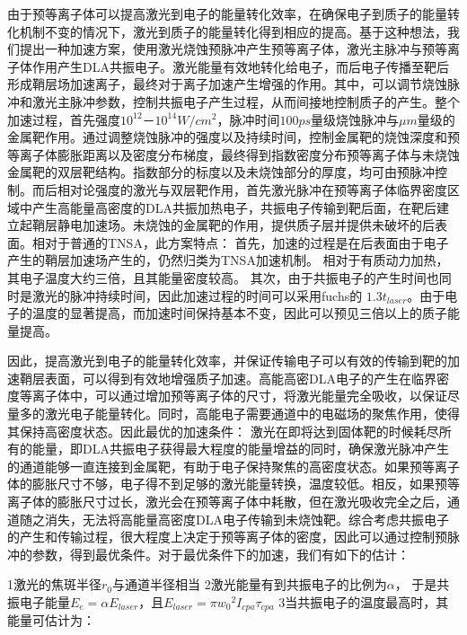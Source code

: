 由于预等离子体可以提高激光到电子的能量转化效率，在确保电子到质子的能量转化机制不变的情况下，激光到质子的能量转化得到相应的提高。基于这种想法，我们提出一种加速方案，使用激光烧蚀预脉冲产生预等离子体，激光主脉冲与预等离子体作用产生DLA共振电子。激光能量有效地转化给电子，而后电子传播至靶后形成鞘层场加速离子，最终对于离子加速产生增强的作用。其中，可以调节烧蚀脉冲和激光主脉冲参数，控制共振电子产生过程，从而间接地控制质子的产生。整个加速过程，首先强度$10^{12}－10^{14} W/cm^2$，脉冲时间$100ps$量级烧蚀脉冲与$\mu m$量级的金属靶作用。通过调整烧蚀脉冲的强度以及持续时间，控制金属靶的烧蚀深度和预等离子体膨胀距离以及密度分布梯度，最终得到指数密度分布预等离子体与未烧蚀金属靶的双层靶结构。指数部分的标度以及未烧蚀部分的厚度，均可由预脉冲控制。而后相对论强度的激光与双层靶作用，首先激光脉冲在预等离子体临界密度区域中产生高能量高密度的DLA共振加热电子，共振电子传输到靶后面，在靶后建立起鞘层静电加速场。未烧蚀的金属靶的作用，提供质子层并提供未破坏的后表面。相对于普通的TNSA，此方案特点：
首先，加速的过程是在后表面由于电子产生的鞘层加速场产生的，仍然归类为TNSA加速机制。
相对于有质动力加热，其电子温度大约三倍，且其能量密度较高。
其次，由于共振电子的产生时间也同时是激光的脉冲持续时间，因此加速过程的时间可以采用fuchs的 $1.3 t_{laser}$\cite{fuchs2006laser}。由于电子的温度的显著提高，而加速时间保持基本不变，因此可以预见三倍以上的质子能量提高。





因此，提高激光到电子的能量转化效率，并保证传输电子可以有效的传输到靶的加速鞘层表面，可以得到有效地增强质子加速。高能高密DLA电子的产生在临界密度等离子体中，可以通过增加预等离子体的尺寸，将激光能量完全吸收，以保证尽量多的激光电子能量转化。同时，高能电子需要通道中的电磁场的聚焦作用，使得其保持高密度状态。因此最优的加速条件：
激光在即将达到固体靶的时候耗尽所有的能量，即DLA共振电子获得最大程度的能量增益的同时，确保激光脉冲产生的通道能够一直连接到金属靶，有助于电子保持聚焦的高密度状态。如果预等离子体的膨胀尺寸不够，电子得不到足够的激光能量转换，温度较低。相反，如果预等离子体的膨胀尺寸过长，激光会在预等离子体中耗散，但在激光吸收完全之后，通道随之消失，无法将高能量高密度DLA电子传输到未烧蚀靶。综合考虑共振电子的产生和传输过程，很大程度上决定于预等离子体的密度，因此可以通过控制预脉冲的参数，得到最优条件。对于最优条件下的加速，我们有如下的估计：




1激光的焦斑半径$r_0$与通道半径相当
2激光能量有到共振电子的比例为$\alpha$， 于是共振电子能量$E_{e} =\alpha E_{laser} $，且$E_{laser}=\pi {w_0}^2 I_{cpa} \tau_{cpa}$
3当共振电子的温度最高时，其能量可估计为：

